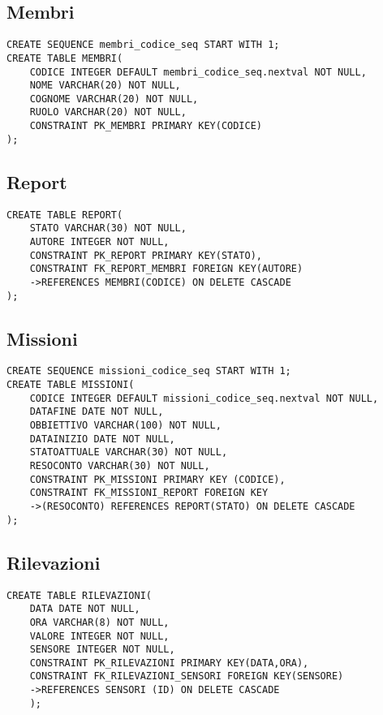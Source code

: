 \begin{description}
\subsection{Membri}
\begin{verbatim}
CREATE SEQUENCE membri_codice_seq START WITH 1;
CREATE TABLE MEMBRI(
    CODICE INTEGER DEFAULT membri_codice_seq.nextval NOT NULL,
    NOME VARCHAR(20) NOT NULL,
    COGNOME VARCHAR(20) NOT NULL,
    RUOLO VARCHAR(20) NOT NULL,
    CONSTRAINT PK_MEMBRI PRIMARY KEY(CODICE)
);
\end{verbatim}

\subsection{Report}
\begin{verbatim}
CREATE TABLE REPORT(
    STATO VARCHAR(30) NOT NULL,
    AUTORE INTEGER NOT NULL,
    CONSTRAINT PK_REPORT PRIMARY KEY(STATO),
    CONSTRAINT FK_REPORT_MEMBRI FOREIGN KEY(AUTORE)
    ->REFERENCES MEMBRI(CODICE) ON DELETE CASCADE
);
\end{verbatim}

\subsection{Missioni}
\begin{verbatim}
CREATE SEQUENCE missioni_codice_seq START WITH 1;
CREATE TABLE MISSIONI(
    CODICE INTEGER DEFAULT missioni_codice_seq.nextval NOT NULL,
    DATAFINE DATE NOT NULL,
    OBBIETTIVO VARCHAR(100) NOT NULL,
    DATAINIZIO DATE NOT NULL,
    STATOATTUALE VARCHAR(30) NOT NULL,
    RESOCONTO VARCHAR(30) NOT NULL,
    CONSTRAINT PK_MISSIONI PRIMARY KEY (CODICE),
    CONSTRAINT FK_MISSIONI_REPORT FOREIGN KEY
    ->(RESOCONTO) REFERENCES REPORT(STATO) ON DELETE CASCADE
);
\end{verbatim}

\subsection{Rilevazioni}
\begin{verbatim}
CREATE TABLE RILEVAZIONI(
    DATA DATE NOT NULL,
    ORA VARCHAR(8) NOT NULL, 
    VALORE INTEGER NOT NULL,
    SENSORE INTEGER NOT NULL,
    CONSTRAINT PK_RILEVAZIONI PRIMARY KEY(DATA,ORA),
    CONSTRAINT FK_RILEVAZIONI_SENSORI FOREIGN KEY(SENSORE)
    ->REFERENCES SENSORI (ID) ON DELETE CASCADE
    );
\end{verbatim}


\end{description}

